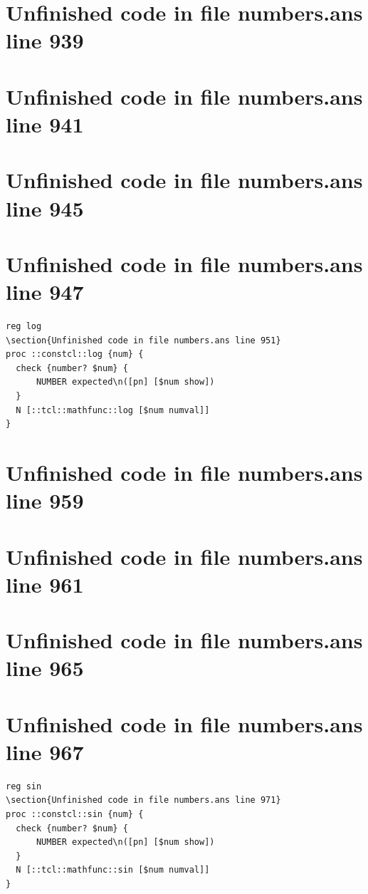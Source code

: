 \documentclass[twoside,9pt]{report}
\begin{document}
\section{Unfinished code in file numbers.ans line 939}
\section{Unfinished code in file numbers.ans line 941}
\section{Unfinished code in file numbers.ans line 945}
\section{Unfinished code in file numbers.ans line 947}
\begin{lstlisting}
reg log
\section{Unfinished code in file numbers.ans line 951}
proc ::constcl::log {num} {
  check {number? $num} {
      NUMBER expected\n([pn] [$num show])
  }
  N [::tcl::mathfunc::log [$num numval]]
}
\end{lstlisting}
\section{Unfinished code in file numbers.ans line 959}
\section{Unfinished code in file numbers.ans line 961}
\section{Unfinished code in file numbers.ans line 965}
\section{Unfinished code in file numbers.ans line 967}
\begin{lstlisting}
reg sin
\section{Unfinished code in file numbers.ans line 971}
proc ::constcl::sin {num} {
  check {number? $num} {
      NUMBER expected\n([pn] [$num show])
  }
  N [::tcl::mathfunc::sin [$num numval]]
}
\end{lstlisting}
\end{document}
